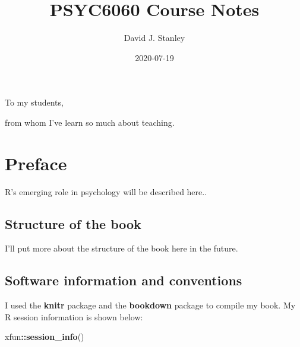 \documentclass[
]{krantz}
\title{PSYC6060 Course Notes}
\author{David J. Stanley}
\date{2020-07-19}
\makeatletter
\newenvironment{Shaded}{\begin{snugshade}}{\end{snugshade}}
\newcommand{\KeywordTok}[1]{\textcolor[rgb]{0.27,0.27,0.27}{\textbf{#1}}}
\newcommand{\NormalTok}[1]{#1}
\newcommand{\OperatorTok}[1]{\textcolor[rgb]{0.43,0.43,0.43}{\textbf{#1}}}
\newenvironment{kframe}{%
\medskip{}
\setlength{\fboxsep}{.8em}
 \def\at@end@of@kframe{}%
 \ifinner\ifhmode%
  \def\at@end@of@kframe{\end{minipage}}%
  \begin{minipage}{\columnwidth}%
 \fi\fi%
 \def\FrameCommand##1{\hskip\@totalleftmargin \hskip-\fboxsep
 \colorbox{shadecolor}{##1}\hskip-\fboxsep
     \hskip-\linewidth \hskip-\@totalleftmargin \hskip\columnwidth}%
 \MakeFramed {\advance\hsize-\width
   \@totalleftmargin\z@ \linewidth\hsize
   \@setminipage}}%
 {\par\unskip\endMakeFramed%
 \at@end@of@kframe}
\renewenvironment{Shaded}{\begin{kframe}}{\end{kframe}}
\makeatother
\begin{document}
\maketitle


\thispagestyle{empty}

\begin{center}
To my students,

from whom I've learn so much about teaching.
\end{center}

\setlength{\abovedisplayskip}{-5pt}
\setlength{\abovedisplayshortskip}{-5pt}

{
\hypersetup{linkcolor=}
\setcounter{tocdepth}{2}
\tableofcontents
}
\listoftables
\listoffigures
\hypertarget{preface}{%
\chapter*{Preface}\label{preface}}


R's emerging role in psychology will be described here..

\hypertarget{structure-of-the-book}{%
\section*{Structure of the book}\label{structure-of-the-book}}


I'll put more about the structure of the book here in the future.

\hypertarget{software-information-and-conventions}{%
\section*{Software information and conventions}\label{software-information-and-conventions}}


I used the \textbf{knitr} package \citep{xie2015} and the \textbf{bookdown} package \citep{R-bookdown} to compile my book. My R session information is shown below:

\begin{Shaded}
\begin{Highlighting}[]
\NormalTok{xfun}\OperatorTok{::}\KeywordTok{session_info}\NormalTok{()}
\end{Highlighting}
\end{Shaded}
\end{document}
